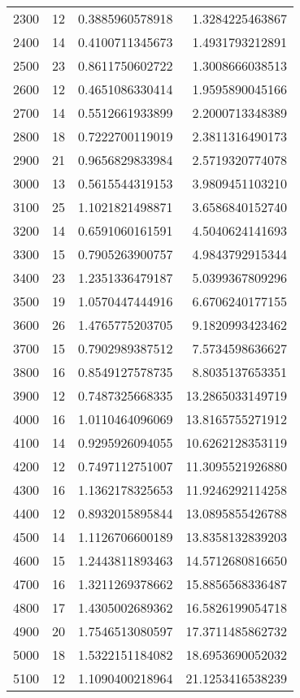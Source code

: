\begin{longtable}{lrrr}
2300 & 12 & 0.3885960578918 & 1.3284225463867 \\
2400 & 14 & 0.4100711345673 & 1.4931793212891 \\
2500 & 23 & 0.8611750602722 & 1.3008666038513 \\
2600 & 12 & 0.4651086330414 & 1.9595890045166 \\
2700 & 14 & 0.5512661933899 & 2.2000713348389 \\
2800 & 18 & 0.7222700119019 & 2.3811316490173 \\
2900 & 21 & 0.9656829833984 & 2.5719320774078 \\
3000 & 13 & 0.5615544319153 & 3.9809451103210 \\
3100 & 25 & 1.1021821498871 & 3.6586840152740 \\
3200 & 14 & 0.6591060161591 & 4.5040624141693 \\
3300 & 15 & 0.7905263900757 & 4.9843792915344 \\
3400 & 23 & 1.2351336479187 & 5.0399367809296 \\
3500 & 19 & 1.0570447444916 & 6.6706240177155 \\
3600 & 26 & 1.4765775203705 & 9.1820993423462 \\
3700 & 15 & 0.7902989387512 & 7.5734598636627 \\
3800 & 16 & 0.8549127578735 & 8.8035137653351 \\
3900 & 12 & 0.7487325668335 & 13.2865033149719 \\
4000 & 16 & 1.0110464096069 & 13.8165755271912 \\
4100 & 14 & 0.9295926094055 & 10.6262128353119 \\
4200 & 12 & 0.7497112751007 & 11.3095521926880 \\
4300 & 16 & 1.1362178325653 & 11.9246292114258 \\
4400 & 12 & 0.8932015895844 & 13.0895855426788 \\
4500 & 14 & 1.1126706600189 & 13.8358132839203 \\
4600 & 15 & 1.2443811893463 & 14.5712680816650 \\
4700 & 16 & 1.3211269378662 & 15.8856568336487 \\
4800 & 17 & 1.4305002689362 & 16.5826199054718 \\
4900 & 20 & 1.7546513080597 & 17.3711485862732 \\
5000 & 18 & 1.5322151184082 & 18.6953690052032 \\
5100 & 12 & 1.1090400218964 & 21.1253416538239 \\
\end{longtable}
